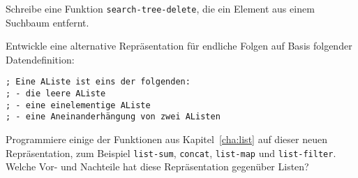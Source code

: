 \begin{aufgabe}
  \label{aufgabe:search-tree-delete}
  Schreibe eine Funktion \texttt{search-tree-delete}, die ein
  Element aus einem Suchbaum entfernt.  
\end{aufgabe}

\begin{aufgabe}
  Entwickle eine alternative Repräsentation für endliche
  Folgen auf Basis folgender Datendefinition:
\begin{lstlisting}
; Eine AListe ist eins der folgenden:
; - die leere AListe
; - eine einelementige AListe
; - eine Aneinanderhängung von zwei AListen
\end{lstlisting}
  Programmiere einige der Funktionen aus Kapitel~\ref{cha:list} auf
  dieser neuen Repräsentation, zum Beispiel \lstinline{list-sum},
  \lstinline{concat}, \lstinline{list-map} und
  \lstinline{list-filter}.  Welche Vor- und Nachteile hat diese
  Repräsentation gegenüber Listen?
\end{aufgabe}

